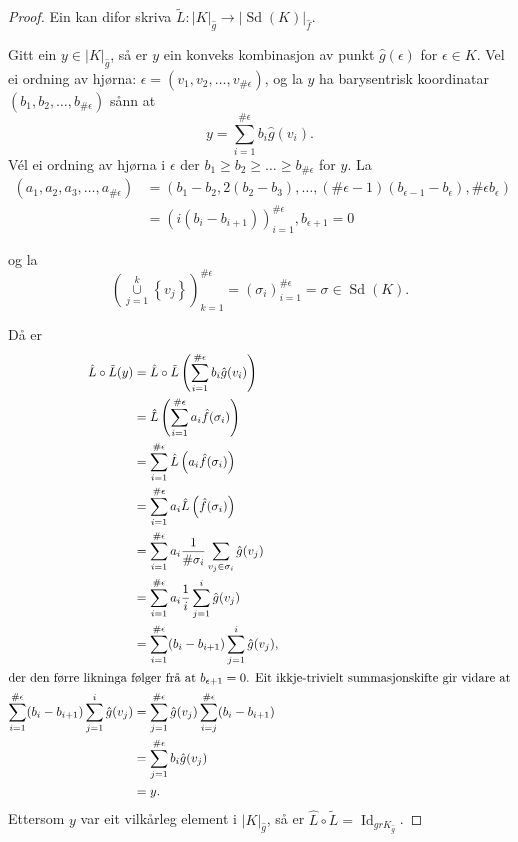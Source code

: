 \documentclass[a4paper, 12pt, norsk]{article}
\theoremstyle{plain}
\theoremstyle{definition}
\newcommand{\union}{ \mathop{\cup}\limits }
\newcommand{\gr}[1]{ \lvert #1 \rvert } %
\newcommand{\set}[1]{ \left\{ #1 \right\} } %
\newcommand{\tuple}[1]{ \left( #1 \right) } %
\DeclareMathOperator{\Sd}{Sd} %
\DeclareMathOperator{\Id}{Id} %
\begin{document}
\begin{proof}
	Ein kan difor skriva \( \tilde{L}: \gr{K}_{\hat{g}} \to \gr{\Sd(K)}_{\hat{f}} \).

	Gitt ein \( y \in \gr{K}_{\hat{g}} \), så er \( y \) ein konveks kombinasjon av punkt \( \hat{g}(\epsilon) \) for \( \epsilon \in K \). Vel ei ordning av hjørna: \( \epsilon = (v_1, v_2, \dots, v_{\#\epsilon}) \), og la \( y \) ha barysentrisk koordinatar \( (b_1, b_2, \dots, b_{\#\epsilon}) \) sånn at
	\[
		y = \sum_{i = 1}^{\#\epsilon} b_i \hat{g}(v_i).
	\]
	Vél ei ordning av hjørna i \( \epsilon \) der \( b_1 \geq b_2 \geq \dots \geq b_{\#\epsilon} \) for \( y \). La 
	\begin{align*}
		(a_1, a_2, a_3, \dots, a_{\#\epsilon}) &= \left( b_1-b_2, 2(b_2-b_3), \dots, (\#\epsilon-1)(b_{\epsilon-1}-b_{\epsilon}), \#\epsilon b_{\epsilon} \right) \\
		&= \left( i (b_i-b_{i+1}) \right)_{i=1}^{\#\epsilon}, b_{\epsilon+1} = 0
	\end{align*}
		
	og la 
	\[ 
		\left(\union_{j = 1}^{k} \set{v_j} \right)_{k=1}^{\#\epsilon} = (\sigma_i)_{i=1}^{\#\epsilon}=\sigma \in \Sd(K).
	\]

	Då er
	\begin{align*} %
		\hat{L}\circ\tilde{L}(y) &= \hat{L}\circ\tilde{L}\tuple{\sum_{i=1}^{\#\epsilon} b_i \hat{g}(v_i)} \\
		&= \hat{L}\left( \sum_{i=1}^{\#\epsilon} a_i \hat{f}(\sigma_i) \right) \\
		&= \sum_{i=1}^{\#\epsilon} \hat{L} \left( a_i \hat{f}(\sigma_i) \right) \\
		&= \sum_{i=1}^{\#\epsilon} a_i \hat{L} \left( \hat{f}(\sigma_i) \right) \\
		&= \sum_{i=1}^{\#\epsilon} a_i \frac{1}{\#\sigma_i} \sum_{v_j \in \sigma_i} \hat{g}(v_j) \\
		&= \sum_{i=1}^{\#\epsilon} a_i \frac{1}{i} \sum_{j = 1}^{i} \hat{g}(v_j) \\
		&= \sum_{i=1}^{\#\epsilon} (b_{i}-b_{i+1}) \sum_{j = 1}^{i} \hat{g}(v_j), \\
		\intertext{der den førre likninga følger frå at \( b_{\epsilon+1} = 0 \). Eit ikkje-trivielt summasjonskifte gir vidare at}
		\sum_{i=1}^{\#\epsilon} (b_{i}-b_{i+1}) \sum_{j = 1}^{i} \hat{g}(v_j) &= \sum_{j=1}^{\#\epsilon} \hat{g}(v_j) \sum_{i = j}^{\#\epsilon} (b_{i}-b_{i+1}) \\
		&= \sum_{j=1}^{\#\epsilon} b_i \hat{g}(v_j) \\
		&= y.
	\end{align*}
	Ettersom \( y \) var eit vilkårleg element i \( \gr{K}_{\hat{g}} \), så er \( \hat{L}\circ\tilde{L} = \Id_{gr{K}_{\hat{g}}} \).


\end{proof}
\end{document}
